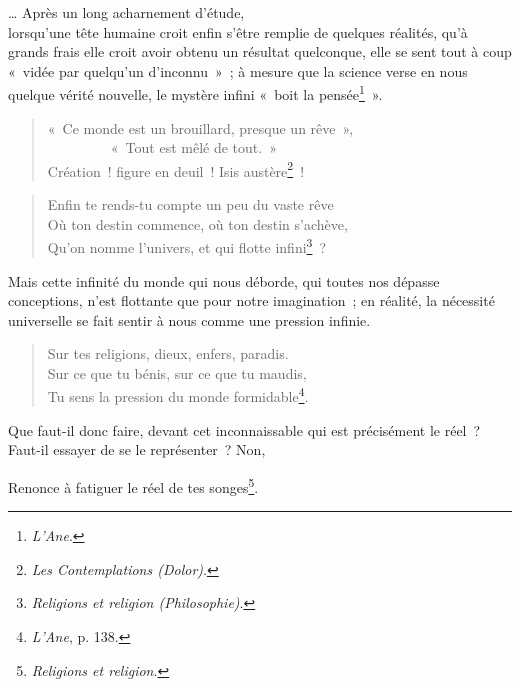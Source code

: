 \documentclass[french,twoside]{book} %
\begin{document}
… Après un long acharnement d’étude,\\

\noindent lorsqu’une tête humaine croit enfin s’être remplie de quelques réalités, qu’à grands frais elle croit avoir obtenu un résultat quelconque, elle se sent tout à coup « vidée par quelqu’un d’inconnu » ; à mesure que la science verse en nous quelque vérité nouvelle, le mystère infini « boit la pensée\footnote{\emph{L’Ane}.} ».\par


\begin{verse}
« Ce monde est un brouillard, presque un rêve »,\\
         « Tout est mêlé de tout. »\\
Création ! figure en deuil ! Isis austère\footnote{\emph{Les Contemplations (Dolor)}.} !\\
\end{verse}



\begin{verse}
Enfin te rends-tu compte un peu du vaste rêve\\
Où ton destin commence, où ton destin s’achève,\\
Qu’on nomme l’univers, et qui flotte infini\footnote{\emph{Religions et religion (Philosophie)}.} ?\\
\end{verse}

\noindent Mais cette infinité du monde qui nous déborde, qui toutes nos dépasse conceptions, n’est flottante que pour notre imagination ; en réalité, la nécessité universelle se fait sentir à nous comme une pression infinie.\par


\begin{verse}
Sur tes religions, dieux, enfers, paradis.\\
Sur ce que tu bénis, sur ce que tu maudis,\\
Tu sens la pression du monde formidable\footnote{\emph{L’Ane}, p. 138.}.\\
\end{verse}

\noindent Que faut-il donc faire, devant cet inconnaissable qui est précisément le réel ? Faut-il essayer de se le représenter ? Non,\par

Renonce à fatiguer le réel de tes songes\footnote{\emph{Religions et religion}.}.\\
\end{document}
